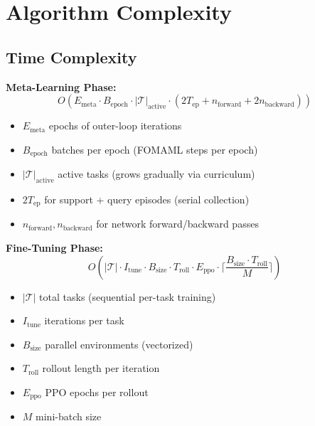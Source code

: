\documentclass[11pt,a4paper]{article}
\begin{document}
\clearpage

\section{Algorithm Complexity}

\subsection{Time Complexity}

\textbf{Meta-Learning Phase:}
\begin{equation}
O(E_{\text{meta}} \cdot B_{\text{epoch}} \cdot |\mathcal{T}|_{\text{active}} \cdot (2 T_{\text{ep}} + n_{\text{forward}} + 2 n_{\text{backward}}))
\end{equation}

\begin{itemize}
	\item $E_{\text{meta}}$ epochs of outer-loop iterations
	\item $B_{\text{epoch}}$ batches per epoch (FOMAML steps per epoch)
	\item $|\mathcal{T}|_{\text{active}}$ active tasks (grows gradually via curriculum)
	\item $2 T_{\text{ep}}$ for support + query episodes (serial collection)
	\item $n_{\text{forward}}, n_{\text{backward}}$ for network forward/backward passes
\end{itemize}

\textbf{Fine-Tuning Phase:}
\begin{equation}
O(|\mathcal{T}| \cdot I_{\text{tune}} \cdot B_{\text{size}} \cdot T_{\text{roll}} \cdot E_{\text{ppo}} \cdot \lceil \frac{B_{\text{size}} \cdot T_{\text{roll}}}{M} \rceil)
\end{equation}

\begin{itemize}
	\item $|\mathcal{T}|$ total tasks (sequential per-task training)
	\item $I_{\text{tune}}$ iterations per task
	\item $B_{\text{size}}$ parallel environments (vectorized)
	\item $T_{\text{roll}}$ rollout length per iteration
	\item $E_{\text{ppo}}$ PPO epochs per rollout
	\item $M$ mini-batch size
\end{itemize}
\end{document}
